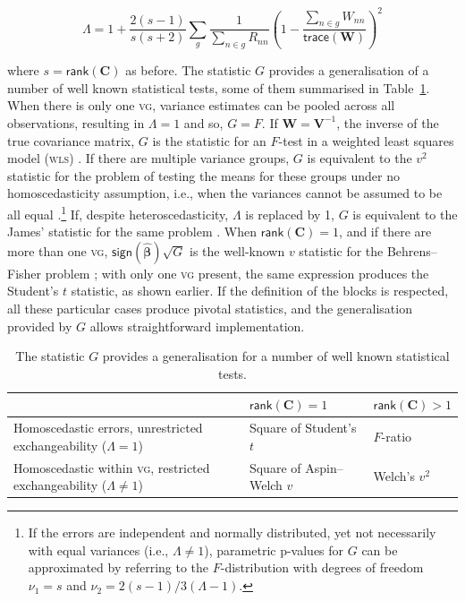\begin{equation}
\Lambda = 1+\frac{2(s-1)}{s(s+2)}\sum_{g} \frac{1}{\sum_{n \in g}R_{nn}} \left(1-\frac{\sum_{n \in g}W_{nn}}{\mathsf{trace}\left(\mathbf{W}\right)}\right)^2
\end{equation}

\noindent
where $s=\mathsf{rank}\left(\mathbf{C}\right)$ as before. The statistic $G$ provides a generalisation of a number of well known statistical tests, some of them summarised in Table~\ref{tab:G}. When there is only one \textsc{vg}, variance estimates can be pooled across all observations, resulting in $\Lambda=1$ and so, $G=F$. If $\mathbf{W}=\mathbf{V}^{-1}$, the inverse of the true covariance matrix, $G$ is the statistic for an $F$-test in a weighted least squares model (\textsc{wls}) \citep{Christensen2002}. If there are multiple variance groups, $G$ is equivalent to the $v^2$ statistic for the problem of testing the means for these groups under no homoscedasticity assumption, i.e., when the variances cannot be assumed to be all equal \citep{Welch1951}.\footnote{If the errors are independent and normally distributed, yet not necessarily with equal variances (i.e., $\Lambda \neq 1$), parametric p-values for $G$ can be approximated by referring to the $F$-distribution with degrees of freedom $\nu_1=s$ and $\nu_2=2(s-1)/3(\Lambda-1)$.} If, despite heteroscedasticity, $\Lambda$ is replaced by 1, $G$ is equivalent to the James' statistic for the same problem \citep{James1951}. When $\mathsf{rank}\left(\mathbf{C}\right) = 1$, and if there are more than one \textsc{vg}, $\mathsf{sign}(\boldsymbol{\hat{\beta}})\sqrt{G}$ is the well-known $v$ statistic for the Behrens--Fisher problem \citep{Fisher1935_fid, Aspin1949}; with only one \textsc{vg} present, the same expression produces the Student's $t$ statistic, as shown earlier. If the definition of the blocks is respected, all these particular cases produce pivotal statistics, and the generalisation provided by $G$ allows straightforward implementation.

\begin{table}[!t]
\caption[Some tests of which the statistic $G$ is a generalisation.]{The statistic $G$ provides a generalisation for a number of well known statistical tests.}
\begin{center}
{\small
\begin{tabular}{@{}m{70mm}<{\raggedright}@{}m{25mm}<{\centering}m{25mm}<{\centering}@{}}
\toprule
{} & $\mathsf{rank}\left(\mathbf{C}\right) = 1$ & $\mathsf{rank}\left(\mathbf{C}\right) > 1$ \\
\midrule
Homoscedastic errors, unrestricted exchangeability ($\Lambda = 1$) & Square of Student's $t$ & $F$-ratio \\
\midrule
Homoscedastic within \textsc{vg}, restricted exchangeability ($\Lambda \neq 1$) & Square of Aspin--Welch $v$ & Welch's $v^2$\\
\bottomrule
\end{tabular}}
\end{center}
\label{tab:G}
\end{table}


